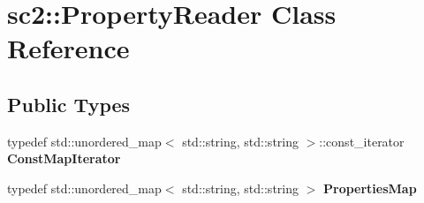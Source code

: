 \hypertarget{classsc2_1_1_property_reader}{}\section{sc2\+:\+:Property\+Reader Class Reference}
\label{classsc2_1_1_property_reader}
\subsection*{Public Types}
\begin{DoxyCompactItemize}
\item 
\mbox{\label{classsc2_1_1_property_reader_a7a4208dfe64603c80bfd64951e1663f1}} 
typedef std\+::unordered\+\_\+map$<$ std\+::string, std\+::string $>$\+::const\+\_\+iterator {\bfseries Const\+Map\+Iterator}
\item 
\mbox{\label{classsc2_1_1_property_reader_a09af7340bd61f0c7048556221fb1a75e}} 
typedef std\+::unordered\+\_\+map$<$ std\+::string, std\+::string $>$ {\bfseries Properties\+Map}
\end{DoxyCompactItemize}
